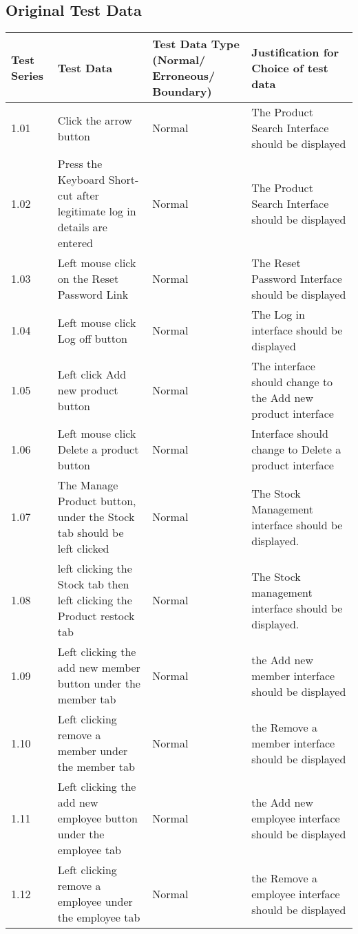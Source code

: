\subsection{Original Test Data}
	\begin{flushleft}
    \begin{longtable}{|p{1.5cm}|p{2.5cm}|p{2cm}|p{4.5cm}|}
        \hline
        \textbf{Test Series} & \textbf{Test Data} & \textbf{Test Data Type (Normal/ Erroneous/ Boundary)} &  \textbf{Justification for Choice of test data}\\ \hline
	1.01 & Click the arrow button & Normal & The Product Search Interface should be displayed  \\ \hline
	1.02 & Press the Keyboard Short-cut after legitimate log in details are entered &  Normal & The Product Search Interface should be displayed \\ \hline
	1.03 & Left mouse click on the Reset Password Link &  Normal & The Reset Password Interface should be displayed  \\ \hline
	1.04 & Left mouse click Log off button &  Normal & The Log in interface should be displayed  \\ \hline
	1.05 & Left click Add new product button &  Normal &  The interface should change to the Add new product interface \\ \hline
	1.06 &  Left mouse click Delete a product button &  Normal & Interface should change to Delete a product interface \\ \hline
	1.07 & The Manage Product button, under the Stock tab should be left clicked &  Normal & The Stock Management interface should be displayed.  \\ \hline
	1.08 &  left clicking the Stock tab then left clicking the Product restock tab &  Normal & The Stock management interface should be displayed.  \\ \hline
	1.09 &  Left clicking the add new member button under the member tab &  Normal & the Add new member interface should be displayed \\ \hline
	1.10 & Left clicking remove a member under the member tab & Normal & the Remove a member interface should be displayed  \\ \hline
	1.11 & Left clicking the add new employee button under the employee tab &  Normal & the Add new employee interface should be displayed \\ \hline
	1.12 & Left clicking remove a employee under the employee tab & Normal & the Remove a employee interface should be displayed  \\ \hline

\end{longtable}
\end{flushleft}
